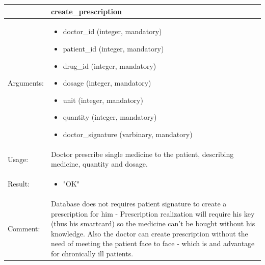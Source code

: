 
    \begin{longtable}{| p{6cm} | p{7.75cm} |}
    \hline
     & create\_prescription \\ \hline
    Arguments: &  \begin{itemize}
    	\item doctor\_id (integer, mandatory)
		\item patient\_id (integer, mandatory)
		\item drug\_id (integer, mandatory)
		\item dosage (integer, mandatory)
		\item unit (integer, mandatory)
		\item quantity (integer, mandatory)
		\item doctor\_signature (varbinary, mandatory)
	\end{itemize}     \\ \hline
    Usage: & Doctor prescribe single medicine to the patient, describing medicine, quantity and dosage. \\ \hline
    Result: & \begin{itemize}
    	\item "OK"
	\end{itemize}     \\ \hline	
		Comment: & Database does not requires patient signature to create a prescription for him - Prescription realization will require his key (thus his smartcard) so the medicine can't be bought without his knowledge. Also the doctor can create prescription without the need of meeting the patient face to face - which is and advantage for chronically ill patients.\\ \hline
    \end{longtable}



